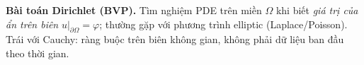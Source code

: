 \textbf{Bài toán Dirichlet (BVP).}
Tìm nghiệm PDE trên miền $\Omega$ khi biết \emph{giá trị của ẩn trên biên} $u|_{\partial\Omega}=\varphi$; thường gặp với phương trình elliptic (Laplace/Poisson). Trái với Cauchy: ràng buộc trên biên không gian, không phải dữ liệu ban đầu theo thời gian.
